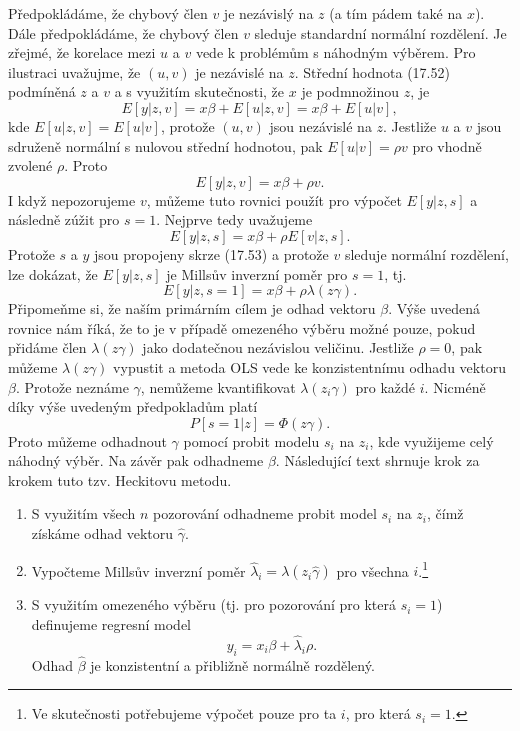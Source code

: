 Předpokládáme, že chybový člen $v$ je nezávislý na $z$ (a tím pádem také na $x$). Dále předpokládáme, že chybový člen $v$ sleduje standardní normální rozdělení. Je zřejmé, že korelace mezi $u$ a $v$ vede k problémům s náhodným výběrem. Pro ilustraci uvažujme, že $(u, v)$ je nezávislé na $z$. Střední hodnota (17.52) podmíněná $z$ a $v$ a s využitím skutečnosti, že $x$ je podmnožinou $z$, je
\begin{equation}
E[y|z, v] = x \beta + E[u | z, v] = x \beta + E[u | v],
\end{equation}
kde $E[u | z, v] = E[u|v]$, protože $(u, v)$ jsou nezávislé na $z$. Jestliže $u$ a $v$ jsou sdruženě normální s nulovou střední hodnotou, pak $E[u|v] = \rho v$ pro vhodně zvolené $\rho$. Proto
\begin{equation}
E[y|z, v] = x \beta + \rho v.
\end{equation}
I když nepozorujeme $v$, můžeme tuto rovnici použít pro výpočet $E[y|z,s]$ a následně zúžit pro $s = 1$. Nejprve tedy uvažujeme
\begin{equation}
E[y|z,s] = x \beta + \rho E[v|z,s].
\end{equation}
Protože $s$ a $y$ jsou propojeny skrze (17.53) a protože $v$ sleduje normální rozdělení, lze dokázat, že $E[y|z,s]$ je Millsův inverzní poměr pro $s = 1$, tj.
\begin{equation}
E[y|z, s = 1] = x \beta + \rho \lambda (z \gamma).
\end{equation}
Připomeňme si, že naším primárním cílem je odhad vektoru $\beta$. Výše uvedená rovnice nám říká, že to je v případě omezeného výběru možné pouze, pokud přidáme člen $\lambda(z \gamma)$ jako dodatečnou nezávislou veličinu. Jestliže $\rho = 0$, pak můžeme $\lambda(z \gamma)$ vypustit a metoda OLS vede ke konzistentnímu odhadu vektoru $\beta$. Protože neznáme $\gamma$, nemůžeme kvantifikovat $\lambda (z_i \gamma)$ pro každé $i$. Nicméně díky výše uvedeným předpokladům platí
\begin{equation}
P[s = 1 | z] = \Phi(z \gamma).
\end{equation}
Proto můžeme odhadnout $\gamma$ pomocí probit modelu $s_i$ na $z_i$, kde využijeme celý náhodný výběr. Na závěr pak odhadneme $\beta$. Následující text shrnuje krok za krokem tuto tzv. Heckitovu metodu.

\begin{enumerate}
\item S využitím všech $n$ pozorování odhadneme probit model $s_i$ na $z_i$, čímž získáme odhad vektoru $\hat{\gamma}$.
\item Vypočteme Millsův inverzní poměr $\hat{\lambda}_i = \lambda(z_i \hat{\gamma})$ pro všechna $i$.\footnote{Ve skutečnosti potřebujeme výpočet pouze pro ta $i$, pro která $s_i = 1$.}
\item S využitím omezeného výběru (tj. pro pozorování pro která $s_i = 1$) definujeme regresní model
\begin{equation}
y_i = x_i \beta + \hat{\lambda}_i \rho.
\end{equation}
Odhad $\hat{\beta}$ je konzistentní a přibližně normálně rozdělený.
\end{enumerate}

